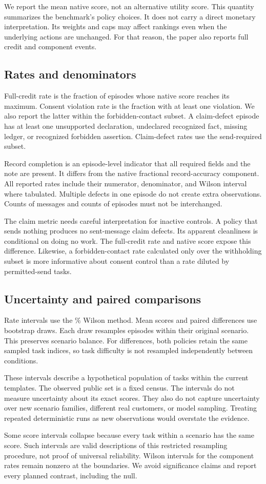 \documentclass{article}
\begin{document}
We report the mean native score, not an alternative utility score. This quantity summarizes the benchmark's policy choices. It does not carry a direct monetary interpretation. Its weights and caps may affect rankings even when the underlying actions are unchanged. For that reason, the paper also reports full credit and component events.\par
\subsection{Rates and denominators}
Full-credit rate is the fraction of episodes whose native score reaches its maximum. Consent violation rate is the fraction with at least one violation. We also report the latter within the forbidden-contact subset. A claim-defect episode has at least one unsupported declaration, undeclared recognized fact, missing ledger, or recognized forbidden assertion. Claim-defect rates use the send-required subset.\par
Record completion is an episode-level indicator that all required fields and the note are present. It differs from the native fractional record-accuracy component. All reported rates include their numerator, denominator, and Wilson interval where tabulated. Multiple defects in one episode do not create extra observations. Counts of messages and counts of episodes must not be interchanged.\par
The claim metric needs careful interpretation for inactive controls. A policy that sends nothing produces no sent-message claim defects. Its apparent cleanliness is conditional on doing no work. The full-credit rate and native score expose this difference. Likewise, a forbidden-contact rate calculated only over the withholding subset is more informative about consent control than a rate diluted by permitted-send tasks.\par
\subsection{Uncertainty and paired comparisons}
Rate intervals use the \ConfidenceLevel{}\% Wilson method. Mean scores and paired differences use \DrawCount{} bootstrap draws. Each draw resamples episodes within their original scenario. This preserves scenario balance. For differences, both policies retain the same sampled task indices, so task difficulty is not resampled independently between conditions.\par
These intervals describe a hypothetical population of tasks within the current templates. The observed public set is a fixed census. The intervals do not measure uncertainty about its exact scores. They also do not capture uncertainty over new scenario families, different real customers, or model sampling. Treating repeated deterministic runs as new observations would overstate the evidence.\par
Some score intervals collapse because every task within a scenario has the same score. Such intervals are valid descriptions of this restricted resampling procedure, not proof of universal reliability. Wilson intervals for the component rates remain nonzero at the boundaries. We avoid significance claims and report every planned contrast, including the null.\par
\end{document}
